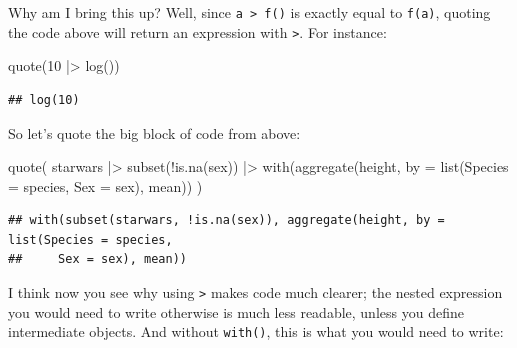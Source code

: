 \documentclass[
]{article}
\newenvironment{Shaded}{\begin{snugshade}}{\end{snugshade}}
\newcommand{\AttributeTok}[1]{\textcolor[rgb]{0.77,0.63,0.00}{#1}}
\newcommand{\DecValTok}[1]{\textcolor[rgb]{0.00,0.00,0.81}{#1}}
\newcommand{\FunctionTok}[1]{\textcolor[rgb]{0.00,0.00,0.00}{#1}}
\newcommand{\NormalTok}[1]{#1}
\newcommand{\OtherTok}[1]{\textcolor[rgb]{0.56,0.35,0.01}{#1}}
\newcommand{\SpecialCharTok}[1]{\textcolor[rgb]{0.00,0.00,0.00}{#1}}
\begin{document}
Why am I bring this up? Well, since \texttt{a\ \textbar{}\textgreater{}\ f()} is exactly equal to \texttt{f(a)}, quoting the code above will return
an expression with \texttt{\textbar{}\textgreater{}}. For instance:

\begin{Shaded}
\begin{Highlighting}[]
\FunctionTok{quote}\NormalTok{(}\DecValTok{10} \SpecialCharTok{|\textgreater{}} \FunctionTok{log}\NormalTok{())}
\end{Highlighting}
\end{Shaded}

\begin{verbatim}
## log(10)
\end{verbatim}

So let's quote the big block of code from above:

\begin{Shaded}
\begin{Highlighting}[]
\FunctionTok{quote}\NormalTok{(}
\NormalTok{  starwars }\SpecialCharTok{|\textgreater{}}
  \FunctionTok{subset}\NormalTok{(}\SpecialCharTok{!}\FunctionTok{is.na}\NormalTok{(sex)) }\SpecialCharTok{|\textgreater{}}
  \FunctionTok{with}\NormalTok{(}\FunctionTok{aggregate}\NormalTok{(height,}
                 \AttributeTok{by =} \FunctionTok{list}\NormalTok{(}\AttributeTok{Species =}\NormalTok{ species,}
                           \AttributeTok{Sex =}\NormalTok{ sex),}
\NormalTok{                 mean))}
\NormalTok{)}
\end{Highlighting}
\end{Shaded}

\begin{verbatim}
## with(subset(starwars, !is.na(sex)), aggregate(height, by = list(Species = species, 
##     Sex = sex), mean))
\end{verbatim}

I think now you see why using \texttt{\textbar{}\textgreater{}} makes code much clearer; the nested expression you would need to write otherwise
is much less readable, unless you define intermediate objects. And without \texttt{with()}, this is what you
would need to write:

\begin{Shaded}
\end{Shaded}
\end{document}
